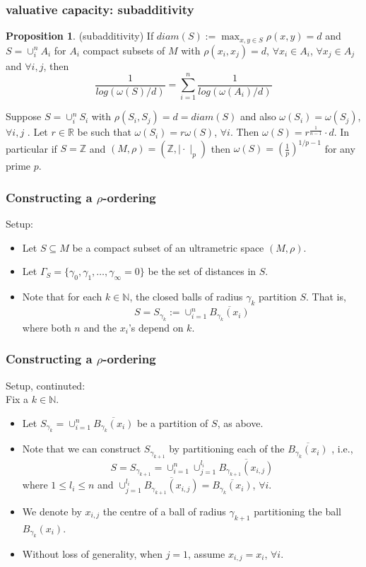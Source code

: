 \documentclass{beamer}
\theoremstyle{definition}
\newtheorem*{proposition*}{Proposition}
\begin{document}
\begin{frame}
\frametitle{valuative capacity: subadditivity}

\begin{proposition*}
\cite{kj}(subadditivity) If  $diam(S) := \max_{x,y \in S} \rho(x,y)=d$ and $S=\cup_i^n A_i$ for $A_i$ compact subsets of $M$ with $\rho(x_i, x_j)=d$, $\forall x_i \in A_i$, $\forall x_j \in A_j$ and $\forall i,j$, then \[\frac{1}{log(\omega(S)/d) } = \sum_{i=1}^n \frac{1}{log(\omega(A_i)/d)}\] 
\end{proposition*}

\begin{corollary}
Suppose $S = \cup_i^n S_i$ with $\rho(S_i, S_j)=d=diam(S)$ and also $\omega(S_i)=\omega(S_j)$, $\forall i,j$ .  Let $r \in \mathbb{R}$ be such that $\omega(S_i)=r\omega(S)$, $\forall i$. Then $\omega(S) = r^{\frac{1}{n-1}}\cdot d$. In particular if $S = \mathbb{Z}$ and $(M,\rho)= (\mathbb{Z}, \mid \cdot\mid_p)$ then $\omega(S)=(\frac{1}{p})^{1/p-1}$ for any prime $p$. 
\end{corollary}
\end{frame}



\begin{frame}
\frametitle{Constructing a $\rho$-ordering}
Setup:
\begin{itemize}
\item Let $S \subseteq M$ be a compact subset of an ultrametric space $(M, \rho)$. 
\item Let $\Gamma_S =\{\gamma_0, \gamma_1,\ldots,\gamma_\infty=0\}$ be the set of distances in $S$.  
\item Note that for each $k \in \mathbb{N}$, the closed balls of radius $\gamma_k$ partition $S$. That is, \[S=S_{\gamma_k} := \cup_{i=1}^n \overline{B_{\gamma_k}(x_i)}\] where both $n$ and the $x_i$'s depend on $k$.
\end{itemize}

\end{frame}

\begin{frame}
\frametitle{Constructing a $\rho$-ordering}
Setup, continuted:
\\Fix a $k \in \mathbb{N}$. 
\begin{itemize}
\item Let $S_{\gamma_k} = \cup_{i=1}^n \overline{B_{\gamma_k}(x_i)}$ be  a partition of $S$, as above. 
 \item Note that we can construct $S_{\gamma_{k+1}}$ by partitioning each of the $\overline{B_{\gamma_k}(x_i)}$ , i.e., \[S = S_{\gamma_{k+1}} = \cup_{i=1}^n \cup_{j=1}^{l_i} \overline{B_{\gamma_{k+1}}(x_{i,j})}\] where $1 \leq l_i \leq n$ and $\cup_{j=1}^{l_i} \overline{B_{\gamma_{k+1}}(x_{i,j})}=\overline{B_{\gamma_k}(x_i)}$, $\forall i$. 
\item We denote by $x_{i,j}$ the centre of a ball of radius $\gamma_{k+1}$ partitioning the ball $B_{\gamma_k}(x_i)$. \item Without loss of generality, when $j=1$, assume $x_{i,j}=x_i$, $\forall i$.\\
\end{itemize}

\end{frame}
\end{document}
